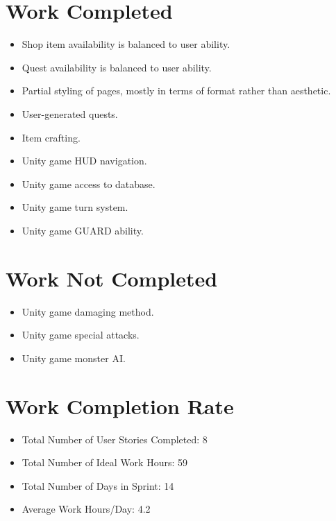 \documentclass[12pt]{report}
\begin{document}
\section{Work Completed}
\begin{itemize}
	\item Shop item availability is balanced to user ability.
	\item Quest availability is balanced to user ability.
	\item Partial styling of pages, mostly in terms of format rather than aesthetic. 
	\item User-generated quests.
	\item Item crafting.
	\item Unity game HUD navigation.
	\item Unity game access to database.
	\item Unity game turn system.
	\item Unity game GUARD ability. 
\end{itemize}

\section{Work Not Completed}
\begin{itemize}
	\item Unity game damaging method.
	\item Unity game special attacks. 
	\item Unity game monster AI.
\end{itemize}

\section{Work Completion Rate}
\begin{itemize}
	\item Total Number of User Stories Completed: 8
	\item Total Number of Ideal Work Hours: 59
	\item Total Number of Days in Sprint: 14
	\item Average Work Hours/Day: 4.2


\end{itemize}
\end{document}

